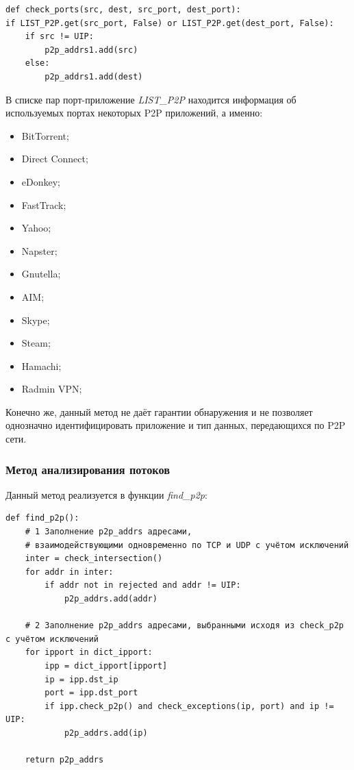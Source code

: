 \documentclass[bachelor, och, coursework]{SCWorks}
\begin{document}
\begin{verbatim}
def check_ports(src, dest, src_port, dest_port):
if LIST_P2P.get(src_port, False) or LIST_P2P.get(dest_port, False):
    if src != UIP:
        p2p_addrs1.add(src)
    else:
        p2p_addrs1.add(dest)
\end{verbatim}

В списке пар порт-приложение \textit{LIST_P2P} находится информация об используемых портах некоторых P2P приложений, а именно:

\begin{itemize}
    \item BitTorrent;
    \item Direct Connect;
    \item eDonkey;
    \item FastTrack;
    \item Yahoo;
    \item Napster;
    \item Gnutella;
    \item AIM;
    \item Skype;
    \item Steam;
    \item Hamachi;
    \item Radmin VPN;
\end{itemize}

Конечно же, данный метод не даёт гарантии обнаружения и не позволяет однозначно идентифицировать приложение и тип данных, передающихся по P2P сети.

\subsubsection{Метод анализирования потоков}
Данный метод реализуется в функции \textit{find_p2p}:

\begin{verbatim}
def find_p2p():
    # 1 Заполнение p2p_addrs адресами, 
    # взаимодействующими одновременно по TCP и UDP с учётом исключений
    inter = check_intersection()
    for addr in inter:
        if addr not in rejected and addr != UIP:
            p2p_addrs.add(addr)

    # 2 Заполнение p2p_addrs адресами, выбранными исходя из check_p2p с учётом исключений
    for ipport in dict_ipport:
        ipp = dict_ipport[ipport]
        ip = ipp.dst_ip
        port = ipp.dst_port
        if ipp.check_p2p() and check_exceptions(ip, port) and ip != UIP:
            p2p_addrs.add(ip)

    return p2p_addrs
\end{verbatim}
\end{document}
